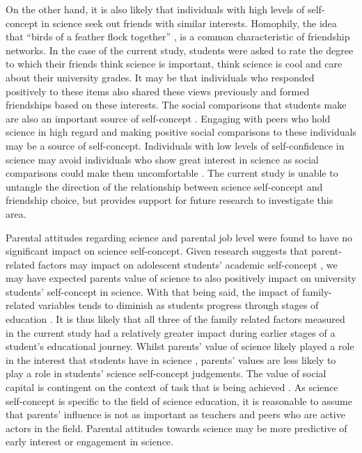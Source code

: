 \documentclass[smallextended]{svjour3}       %
\begin{document}
On the other hand, it is also likely that individuals with high levels of self-concept in science seek out friends with similar interests. Homophily, the idea that ``birds of a feather flock together'' \cite{mcpherson2001birds}, is a common characteristic of friendship networks. In the case of the current study, students were asked to rate the degree to which their friends think science is important, think science is cool and care about their university grades. It may be that individuals who responded positively to these items also shared these views previously and formed friendships based on these interests. The social comparisons that students make are also an important source of self-concept \cite{butz2015salient}. Engaging with peers who hold science in high regard and making positive social comparisons to these individuals may be a source of self-concept. Individuals with low levels of self-confidence in science may avoid individuals who show great interest in science as social comparisons could make them uncomfortable \cite{bong1999comparison}. The current study is unable to untangle the direction of the relationship between science self-concept and friendship choice, but provides support for future research to investigate this area.   

Parental attitudes regarding science and parental job level were found to have no significant impact on science self-concept. Given research suggests that parent-related factors may impact on adolescent students' academic self-concept \cite{fan2010effects}, we may have expected parents value of science to also positively impact on university students' self-concept in science. With that being said, the impact of family-related variables tends to diminish as students progress through stages of education \cite{holm2011dealing}. It is thus likely that all three of the family related factors measured in the current study had a relatively greater impact during earlier stages of a student's educational journey. Whilst parents' value of science likely played a role in the interest that students have in science \cite{archer2013aspires}, parents' values are less likely to play a role in students' science self-concept judgements. The value of social capital is contingent on the context of task that is being achieved \cite{Adler2017}. As science self-concept is specific to the field of science education, it is reasonable to assume that parents' influence is not as important as teachers and peers who are active actors in the field. Parental attitudes towards science may be more predictive of early interest or engagement in science.  
\end{document}
